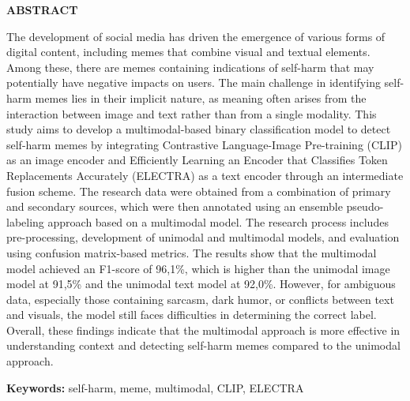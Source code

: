 \clearpage
{}%
\thispagestyle{fancy}

\begin{center}
	\large \bfseries \MakeUppercase{Abstract}\\
	\bigskip
	
	\normalsize \normalfont \justifying \singlespacing
	The development of social media has driven the emergence of various forms of digital content, including memes that combine visual and textual elements. Among these, there are memes containing indications of self-harm that may potentially have negative impacts on users. The main challenge in identifying self-harm memes lies in their implicit nature, as meaning often arises from the interaction between image and text rather than from a single modality. This study aims to develop a multimodal-based binary classification model to detect self-harm memes by integrating Contrastive Language-Image Pre-training (CLIP)  as an image encoder and Efficiently Learning an Encoder that Classifies Token Replacements Accurately (ELECTRA) as a text encoder through an intermediate fusion scheme. The research data were obtained from a combination of primary and secondary sources, which were then annotated using an ensemble pseudo-labeling approach based on a multimodal model. The research process includes pre-processing, development of unimodal and multimodal models, and evaluation using confusion matrix-based metrics. The results show that the multimodal model achieved an F1-score of 96,1\%, which is higher than the unimodal image model at 91,5\% and the unimodal text model at 92,0\%. However, for ambiguous data, especially those containing sarcasm, dark humor, or conflicts between text and visuals, the model still faces difficulties in determining the correct label. Overall, these findings indicate that the multimodal approach is more effective in understanding context and detecting self-harm memes compared to the unimodal approach.\par

    \vspace{20pt}
	\raggedright \textbf{Keywords:} self-harm, meme, multimodal, CLIP, ELECTRA
	
	\vfill
	
\end{center}
\clearpage
